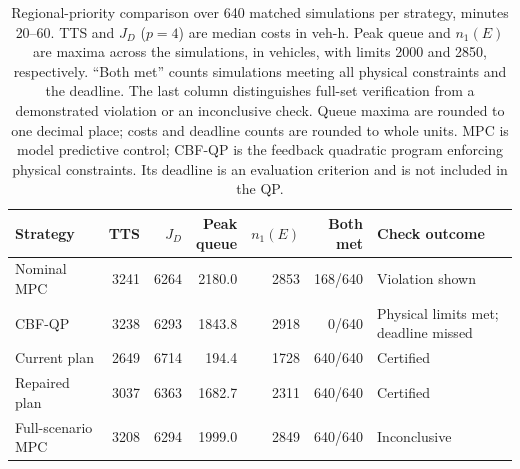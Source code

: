 \documentclass[final]{cas-sc}
\theoremstyle{definition}
\theoremstyle{plain}
\theoremstyle{definition}
\theoremstyle{plain}
\begin{document}
\begin{table}[pos=!htb]
\centering\small
\caption{Regional-priority comparison over 640 matched simulations per
strategy, minutes 20--60. TTS and $J_D$ ($p=4$) are median costs in
veh-h. Peak queue and $n_1(E)$ are maxima across the simulations, in
vehicles, with limits 2000 and 2850, respectively. ``Both met'' counts
simulations meeting all physical constraints and the deadline. The
last column distinguishes full-set verification from a demonstrated
violation or an inconclusive check. Queue maxima are rounded to one
decimal place; costs and deadline counts are rounded to whole units.
MPC is model predictive control; CBF-QP is the feedback quadratic
program enforcing physical constraints. Its deadline is an evaluation
criterion and is not included in the QP.}
\label{tab:benchmark-conflict}
\setlength{\tabcolsep}{3pt}
\begin{tabularx}{\linewidth}{@{}>{\raggedright\arraybackslash}p{3.4cm}rrrrr>{\raggedright\arraybackslash}X@{}}
\toprule
Strategy & TTS & $J_D$ & \shortstack{Peak\\queue} & $n_1(E)$ & \shortstack{Both\\met} & Check outcome\\
\midrule
Nominal MPC & 3241 & 6264 & 2180.0 & 2853 & 168/640 & Violation shown\\
CBF-QP & 3238 & 6293 & 1843.8 & 2918 & 0/640 & Physical limits met; deadline missed\\
Current plan & 2649 & 6714 & 194.4 & 1728 & 640/640 & Certified\\
Repaired plan & 3037 & 6363 & 1682.7 & 2311 & 640/640 & Certified\\
Full-scenario MPC & 3208 & 6294 & 1999.0 & 2849 & 640/640 & Inconclusive\\
\bottomrule
\end{tabularx}
\end{table}
\end{document}
